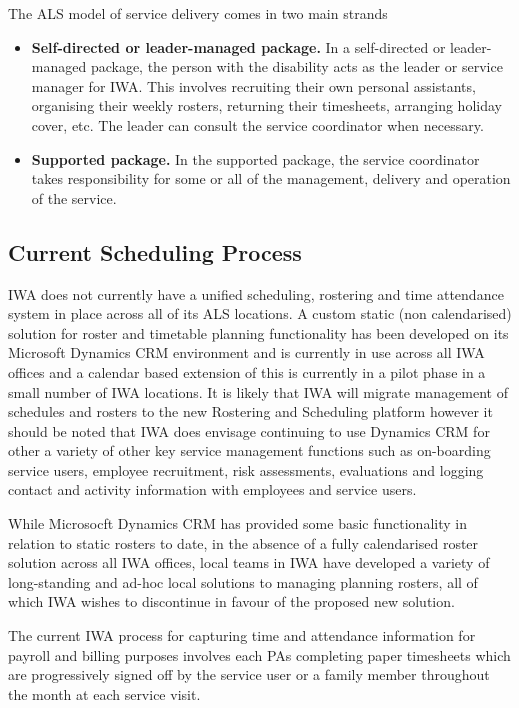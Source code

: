 \documentclass[a4paper,12pt]{article}
\begin{document}
\begin{samepage}
The ALS model of service delivery comes in two main strands
\begin{itemize}
\item  \textbf {Self-directed or leader-managed package. }In a self-directed or leader-managed package, the person with the disability acts as the leader or service manager for IWA. This involves recruiting their own personal assistants, organising their weekly rosters, returning their timesheets, arranging holiday cover, etc. The leader can consult the service coordinator when necessary.
\item \textbf {Supported package.} In the supported package, the service coordinator takes responsibility for some or all of the management, delivery and operation of the service.
\end{itemize} 

\subsection {Current Scheduling Process}
IWA does not currently have a unified scheduling, rostering and time attendance system in place across all of its ALS locations. A custom static (non calendarised) solution for roster and timetable planning functionality has been developed on its Microsoft Dynamics CRM environment and is currently in use across all IWA offices and a calendar based extension of this is currently in a pilot phase in a small number of IWA locations.  It is likely that IWA will migrate management of schedules and rosters to the new Rostering and Scheduling  platform however it should be noted that IWA does envisage continuing to use Dynamics CRM for other a variety of other key service management functions such as on-boarding service users, employee recruitment, risk assessments, evaluations and logging contact and activity information with employees and service users. 

While Microsocft Dynamics CRM has provided some basic functionality in relation to static rosters to date, in the absence of a fully calendarised roster solution across all IWA offices, local teams in IWA have developed a variety of long-standing and ad-hoc local solutions to managing planning rosters, all of which IWA wishes to discontinue in favour of the proposed new solution. 

The current IWA process for capturing  time and attendance information for payroll and billing purposes involves each PAs completing paper timesheets which are progressively signed off by the service user or a family member throughout the month at each service visit. 


\end{samepage}
\end{document}
